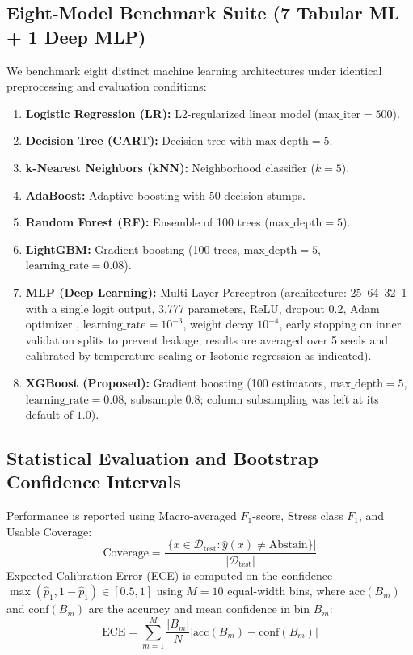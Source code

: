 \documentclass[conference]{IEEEtran}
\begin{document}
\subsection{Eight-Model Benchmark Suite (7 Tabular ML + 1 Deep MLP)}
We benchmark eight distinct machine learning architectures under identical preprocessing and evaluation conditions:
\begin{enumerate}
    \item \textbf{Logistic Regression (LR):} L2-regularized linear model ($\text{max\_iter}=500$).
    \item \textbf{Decision Tree (CART):} Decision tree \cite{breiman1984classification} with $\text{max\_depth}=5$.
    \item \textbf{k-Nearest Neighbors (kNN):} Neighborhood classifier \cite{cover1967nearest} ($k=5$).
    \item \textbf{AdaBoost:} Adaptive boosting \cite{freund1997decision} with 50 decision stumps.
    \item \textbf{Random Forest (RF):} Ensemble of 100 trees \cite{breiman2001random} ($\text{max\_depth}=5$).
    \item \textbf{LightGBM:} Gradient boosting \cite{ke2017lightgbm} (100 trees, $\text{max\_depth}=5$, $\text{learning\_rate}=0.08$).
    \item \textbf{MLP (Deep Learning):} Multi-Layer Perceptron (architecture: 25--64--32--1 with a single logit output, 3,777 parameters, ReLU, dropout 0.2, Adam optimizer \cite{kingma2015adam}, $\text{learning\_rate}=10^{-3}$, weight decay $10^{-4}$, early stopping on inner validation splits to prevent leakage; results are averaged over 5 seeds and calibrated by temperature scaling or Isotonic regression as indicated).
    \item \textbf{XGBoost (Proposed):} Gradient boosting (100 estimators, $\text{max\_depth}=5$, $\text{learning\_rate}=0.08$, subsample $0.8$; column subsampling was left at its default of $1.0$).
\end{enumerate}

\subsection{Statistical Evaluation and Bootstrap Confidence Intervals}
Performance is reported using Macro-averaged $F_1$-score, Stress class $F_1$, and Usable Coverage:
\begin{equation}
\text{Coverage} = \frac{|\{x \in \mathcal{D}_{\text{test}} : \hat{y}(x) \neq \text{Abstain}\}|}{|\mathcal{D}_{\text{test}}|}
\end{equation}
Expected Calibration Error (ECE) \cite{naeini2015obtaining} is computed on the confidence $\max(\hat{p}_1, 1-\hat{p}_1)\in[0.5,1]$ using $M=10$ equal-width bins, where $\text{acc}(B_m)$ and $\text{conf}(B_m)$ are the accuracy and mean confidence in bin $B_m$:
\begin{equation}
\text{ECE} = \sum_{m=1}^M \frac{|B_m|}{N} \left| \text{acc}(B_m) - \text{conf}(B_m) \right|
\end{equation}
\end{document}
